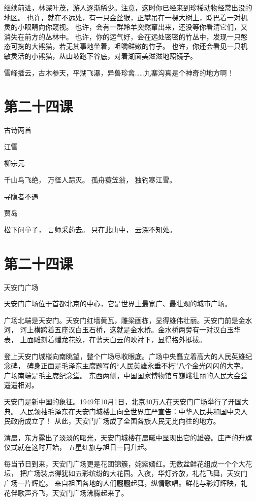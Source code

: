 \documentclass[12pt,UTF8]{ctexbook}
\begin{document}
继续前进，林深叶茂，游人逐渐稀少。注意，这时你已经来到珍稀动物经常出没的地区。
也许，就在不远处，有一只金丝猴，正攀吊在一棵大树上，眨巴着一对机灵的小眼睛向你窥视。
也许，会有一群羚羊突然窜出来，还没等你看清它们，又消失在前方的丛林中。
也许，你的运气好，会在远处密密的竹丛中，发现一只憨态可掬的大熊猫，若无其事地坐着，咀嚼鲜嫩的竹子。
也许，你还会看见一只机敏灵活的小熊猫，从山坡跑下谷底，对着湖面美滋滋地照镜子。

雪峰插云，古木参天，平湖飞瀑，异兽珍禽……九寨沟真是个神奇的地方啊！

\section{第二十四课}

古诗两首

江雪 

柳宗元

千山鸟飞绝，
万径人踪灭。
孤舟蓑笠翁，
独钓寒江雪。

寻隐者不遇

贾岛

松下问童子，
言师采药去。
只在此山中，
云深不知处。

\section{第二十四课}

天安门广场

天安门广场位于首都北京的中心，它是世界上最宽广、最壮观的城市广场。

广场北端是天安门。天安门红墙黄瓦，雕梁画栋，显得雄伟壮丽。天安门前是金水河，
河上横跨着五座汉白玉石桥，这就是金水桥。金水桥两旁有一对汉白玉华表，
上面雕刻着蟠龙花纹，在蓝天白云的映衬下，显得格外挺拔。

登上天安门城楼向南眺望，整个广场尽收眼底。广场中央矗立着高大的人民英雄纪念碑，
碑身正面是毛泽东主席题写的“人民英雄永垂不朽”八个金光闪闪的大字。广场南端是毛主席纪念堂。
东西两侧，中国国家博物馆与巍峨壮丽的人民大会堂遥遥相对。

天安门是新中国的象征。1949年10月1日，北京30万人在天安门广场举行了开国大典。
人民领袖毛泽东在天安门城楼上向全世界庄严宣告：中华人民共和国中央人民政府成立了！
从此，天安门广场成了全国各族人民无比向往的地方。

清晨，东方露出了淡淡的曙光，天安门城楼在晨曦中显现出它的雄姿。庄严的升旗仪式就在这时开始，
五星红旗与旭日一同升起。

每当节日到来，天安门广场更是花团锦簇，姹紫嫣红。无数盆鲜花组成一个个大花坛，
把广场装点得犹如五彩缤纷的大花园。入夜，华灯齐放，礼花飞舞，天安门广场一片辉煌。
来自祖国各地的人们翩翩起舞，纵情歌唱。鲜花与彩灯辉映，礼花伴歌声齐飞，天安门广场沸腾起来了。
\end{document}
